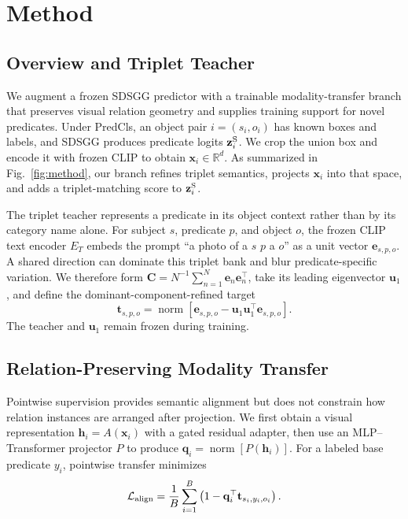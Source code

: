 \section{Method}
\label{sec:method}

\subsection{Overview and Triplet Teacher}
\label{sec:method_overview}

We augment a frozen SDSGG predictor with a trainable modality-transfer branch
that preserves visual relation geometry and supplies training support for novel
predicates. Under PredCls, an object pair $i=(s_i,o_i)$ has known boxes and
labels, and SDSGG produces predicate logits $\mathbf z_i^{\rm S}$. We crop the
union box and encode it with frozen CLIP to obtain
$\mathbf x_i\in\mathbb R^d$. As summarized in Fig.~\ref{fig:method}, our
branch refines triplet semantics, projects $\mathbf x_i$ into that space, and
adds a triplet-matching score to $\mathbf z_i^{\rm S}$.



The triplet teacher represents a predicate in its object context rather than
by its category name alone. For subject $s$, predicate $p$, and object $o$,
the frozen CLIP text encoder $E_T$ embeds the prompt ``a photo of a $s$ $p$ a
$o$'' as a unit vector $\mathbf e_{s,p,o}$. A shared direction can dominate
this triplet bank and blur predicate-specific variation. We therefore form
$\mathbf C=N^{-1}\sum_{n=1}^{N}\mathbf e_n\mathbf e_n^\top$, take its leading
eigenvector $\mathbf u_1$, and define the dominant-component-refined target
\begin{equation}
 \mathbf t_{s,p,o}=\operatorname{norm}\!\left[
 \mathbf e_{s,p,o}-\mathbf u_1\mathbf u_1^\top\mathbf e_{s,p,o}\right].
 \label{eq:dcr}
\end{equation}
The teacher and $\mathbf u_1$ remain frozen during training.

\subsection{Relation-Preserving Modality Transfer}
\label{sec:relation_transfer}

Pointwise supervision provides semantic alignment but does not constrain how
relation instances are arranged after projection. We first obtain a visual
representation $\mathbf h_i=A(\mathbf x_i)$ with a gated residual adapter,
then use an MLP--Transformer projector $P$ to produce
$\mathbf q_i=\operatorname{norm}[P(\mathbf h_i)]$. For a labeled base
predicate $y_i$, pointwise transfer minimizes
\begin{equation}
 \mathcal L_{\rm align}=\frac{1}{B}\sum_{i=1}^{B}
 \left(1-\mathbf q_i^\top\mathbf t_{s_i,y_i,o_i}\right).
 \label{eq:align}
\end{equation}

